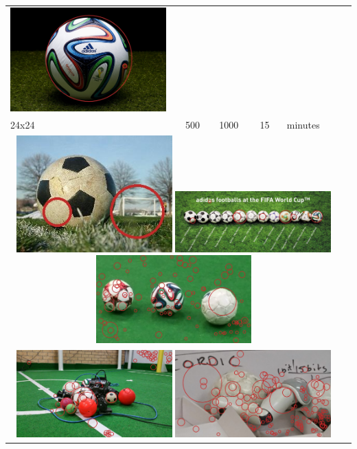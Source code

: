 \begin{tabularx}{\textwidth}{llllll}
{        \includegraphics[width=6.0cm]{results/1/sphere_8}
    } \\
    24x24 & 500 & 1000 & 15 & \mytilda2 minutes \\
    \multicolumn{5}{c}{
        \includegraphics[width=6.0cm]{results/2/sphere_3}
        \includegraphics[width=6.0cm]{results/2/sphere_4}
        \includegraphics[width=6.0cm]{results/2/sphere_5}
    } \\
    \multicolumn{5}{c}{
        \includegraphics[width=6.0cm]{results/2/sphere_6}
        \includegraphics[width=6.0cm]{results/2/sphere_7}
}
\end{tabularx}
